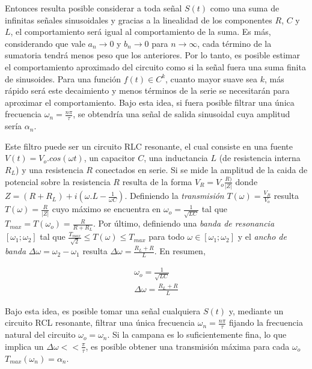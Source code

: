 \documentclass[11pt,a4paper]{article}
\begin{document}
Entonces resulta posible considerar a toda señal $S(t)$ como una suma de infinitas señales sinusoidales y gracias a la linealidad de los componentes $R$, $C$ y $L$, el comportamiento será igual al comportamiento de la suma. Es más, considerando que vale $a_n \rightarrow 0$ y $b_n \rightarrow 0$ para $n \rightarrow \infty$, cada término de la sumatoria tendrá menos peso que los anteriores. Por lo tanto, es posible estimar el comportamiento aproximado del circuito como si la señal fuera una suma finita de sinusoides. Para una función $f(t)\in C^k$, cuanto mayor suave sea $k$, más rápido será este decaimiento y menos términos de la serie se necesitarán para aproximar el comportamiento. Bajo esta idea, si fuera posible filtrar una única frecuencia $\omega_n = \frac{n\pi}{\tau}$, se obtendría una señal de salida sinusoidal cuya amplitud sería $\alpha_n$. 

Este filtro puede ser un circuito RLC resonante, el cual consiste en una fuente $V(t) = V_o.cos(\omega t)$, un capacitor $C$, una inductancia $L$ (de resistencia interna $R_L$) y una resistencia $R$ conectados en serie. Si se mide la amplitud de la caida de potencial sobre la resistencia $R$ resulta de la forma $V_R = V_o\frac{R)}{|Z|}$ donde $Z = (R+R_L)+i(\omega.L-\frac{1}{\omega C})$. Definiendo la \textit{transmisión} $T(\omega) = \frac{V_R}{V_o}$ resulta $T(\omega) = \frac{R}{|Z|}$ cuyo máximo se encuentra en $\omega_o = \frac{1}{\sqrt{LC}}$ tal que $T_{max} = T(\omega_o) = \frac{R}{R+R_L}$. Por último, definiendo una \textit{banda de resonancia} $[\omega_1;\omega_2]$ tal que $\frac{T_{max}}{\sqrt{2}} \leq T(\omega) \leq T_{max}$ para todo $\omega \in [\omega_1;\omega_2]$ y el \textit{ancho de banda} $\Delta\omega = \omega_2 - \omega_1$ resulta $\Delta\omega = \frac{R_L+R}{L}$. En resumen,

\begin{equation}
\begin{split}
\omega_o = \frac{1}{\sqrt{LC}}\\
\Delta\omega = \frac{R_L+R}{L}
\end{split}
\label{eq:resonante}
\end{equation}

Bajo esta idea, es posible tomar una señal cualquiera $S(t)$ y, mediante un circuito RCL resonante, filtrar una única frecuencia $\omega_n = \frac{n\pi}{\tau}$ fijando la frecuencia natural del circuito $\omega_o = \omega_n$. Si la campana es lo suficientemente fina, lo que implica un $\Delta \omega << \frac{\pi}{\tau}$, es posible obtener una transmisión máxima para cada $\omega_o$ $T_{max}(\omega_n) = \alpha_n$.
\end{document}
